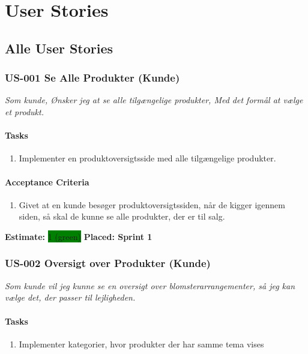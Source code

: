 \chapter{User Stories}
\label{appendix:userstories}

\section{Alle User Stories}
\label{sec:all-user-stories}

\subsection{US-001 Se Alle Produkter (Kunde)}
\label{sec:US-001}
\textit{Som kunde, Ønsker jeg at se alle tilgængelige produkter, Med det formål at vælge et produkt.}
\subsubsection*{\textbf{Tasks}}
\begin{enumerate}
  \item Implementer en produktoversigtsside med alle tilgængelige produkter.
\end{enumerate}
\subsubsection*{\textbf{Acceptance Criteria}}
\begin{enumerate}
  \item Givet at en kunde besøger produktoversigtssiden, når de kigger igennem siden, så skal de kunne se alle produkter, der er til salg.
\end{enumerate}
\textbf{Estimate:} \colorbox{green}{1 (green)}
\textbf{Placed: Sprint 1}
\par\noindent\dotfill

\subsection{US-002 Oversigt over Produkter (Kunde)}
\label{sec:US-002}
\textit{Som kunde vil jeg kunne se en oversigt over blomsterarrangementer, så jeg kan vælge det, der passer til lejligheden.}
\subsubsection*{\textbf{Tasks}}
\begin{enumerate}
  \item Implementer kategorier, hvor produkter der har samme tema vises
\end{enumerate}
